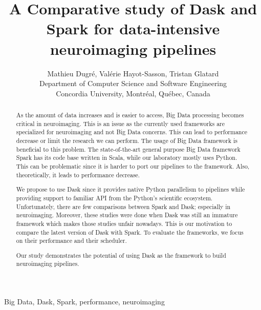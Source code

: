 \documentclass[conference]{IEEEtran}
\begin{document}
\title{A Comparative study of Dask and Spark for data-intensive neuroimaging pipelines}

\author{Mathieu Dugr\'e, Val\'erie Hayot-Sasson, Tristan Glatard\\
Department of Computer Science and Software Engineering\\
Concordia University, Montr\'eal, Qu\'ebec, Canada
}

\maketitle

\begin{abstract}
As the amount of data increases and is easier to access, Big Data processing becomes
critical in neuroimaging.
This is an issue as the currently used frameworks are specialized for neuroimaging
and not Big Data concerns. This can lead to performance decrease or limit the
research we can perform.
The usage of Big Data framework is beneficial to this problem. The state-of-the-art
general purpose Big Data framework Spark has its code base written in Scala, while
our laboratory mostly uses Python. This can be problematic since it is harder to port
our pipelines to the framework. Also, theoretically, it leads to performance decrease.

We propose to use Dask since it provides native Python parallelism to pipelines while
providing support to familiar API from the Python's scientific ecosystem.
Unfortunately, there are few comparisons between Spark and Dask; especially in
neuroimaging. Moreover, these studies were done when Dask was still an immature
framework which makes those studies unfair nowadays. This is our motivation to
compare the latest version of Dask with Spark.
To evaluate the frameworks, we focus on their performance and their scheduler.

Our study demonstrates the potential of using Dask as the framework to build
neuroimaging pipelines.
\end{abstract}

\begin{IEEEkeywords}
Big Data, Dask, Spark, performance, neuroimaging
\end{IEEEkeywords}
\end{document}
